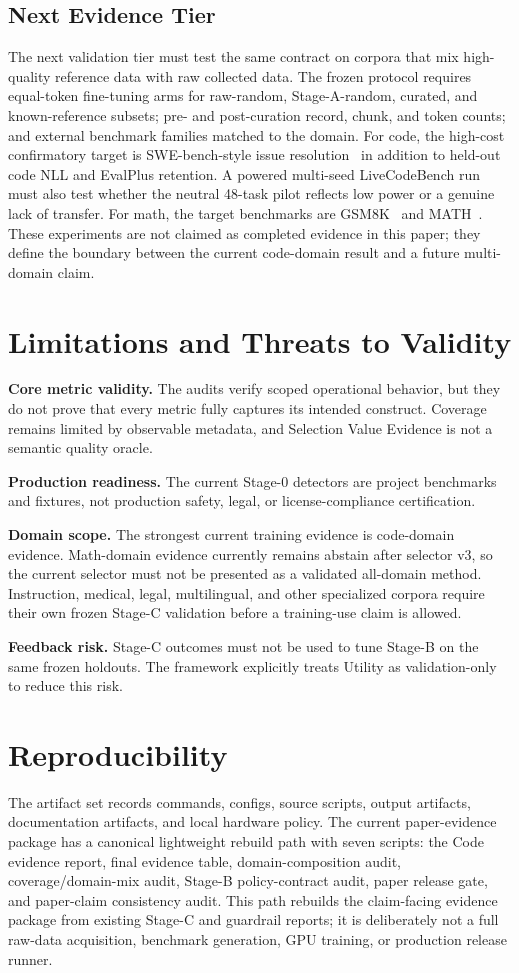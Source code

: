 \documentclass[conference]{IEEEtran}
\begin{document}
\subsection{Next Evidence Tier}
The next validation tier must test the same contract on corpora that mix
high-quality reference data with raw collected data.  The frozen protocol
requires equal-token fine-tuning arms for raw-random, Stage-A-random, curated,
and known-reference subsets; pre- and post-curation record, chunk, and token
counts; and external benchmark families matched to the domain.  For code, the
high-cost confirmatory target is SWE-bench-style issue resolution~\cite{swebench}
in addition to held-out code NLL and EvalPlus retention.  A powered multi-seed
LiveCodeBench run must also test whether the neutral 48-task pilot reflects low
power or a genuine lack of transfer.  For math, the target
benchmarks are GSM8K~\cite{gsm8k} and MATH~\cite{math}.  These experiments are
not claimed as completed evidence in this paper; they define the boundary
between the current code-domain result and a future multi-domain claim.

\section{Limitations and Threats to Validity}
\textbf{Core metric validity.}  The audits verify scoped operational behavior,
but they do not prove that every metric fully captures its intended construct.
Coverage remains limited by observable metadata, and Selection Value Evidence
is not a semantic quality oracle.

\textbf{Production readiness.}  The current Stage-0 detectors are project
benchmarks and fixtures, not production safety, legal, or license-compliance
certification.

\textbf{Domain scope.}  The strongest current training evidence is code-domain
evidence.  Math-domain evidence currently remains abstain after selector v3,
so the current selector must not be presented as a validated all-domain method.
Instruction, medical, legal, multilingual, and other specialized corpora
require their own frozen Stage-C validation before a training-use claim is
allowed.

\textbf{Feedback risk.}  Stage-C outcomes must not be used to tune Stage-B on
the same frozen holdouts.  The framework explicitly treats Utility as
validation-only to reduce this risk.

\section{Reproducibility}
The artifact set records commands, configs, source scripts, output artifacts,
documentation artifacts, and local hardware policy.  The current paper-evidence
package has a canonical lightweight rebuild path with seven scripts:
the Code evidence report, final evidence table, domain-composition audit,
coverage/domain-mix audit, Stage-B policy-contract audit, paper release gate,
and paper-claim consistency audit.  This path
rebuilds the claim-facing evidence package from existing Stage-C and guardrail
reports; it is deliberately not a full raw-data acquisition, benchmark
generation, GPU training, or production release runner.
\end{document}
